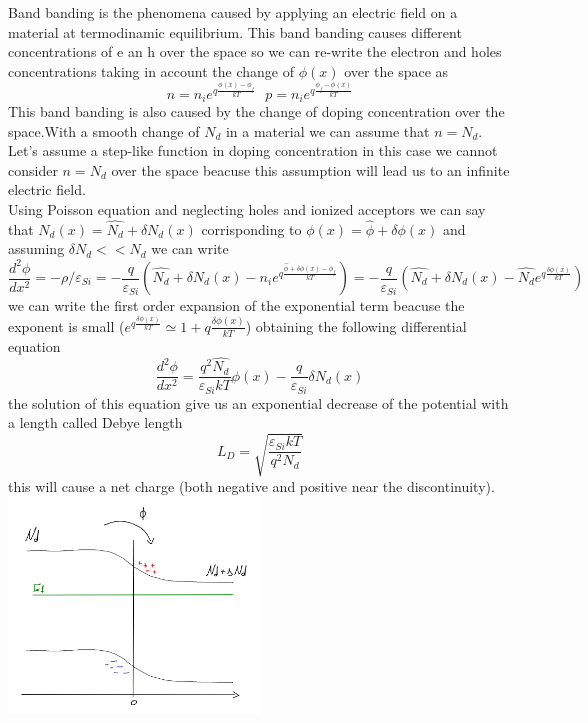 Band banding is the phenomena caused by applying an electric field on a material at termodinamic equilibrium. This band banding causes different concentrations of e an h over the space so we can re-write the electron and holes concentrations taking in account the change of $\phi(x)$ over the space as
\begin{equation}
n=n_ie^{q\frac{\phi(x)-\phi_f}{kT}} \ \ \ p=n_ie^{q\frac{\phi_f-\phi(x)}{kT}}
\end{equation}
This band banding is also caused by the change of doping concentration over the space.With a smooth change of $N_d$ in a material we can assume that $n=N_d$.\\
Let's assume a step-like function in doping concentration in this case we cannot consider $n=N_d$ over the space beacuse this assumption will lead us to an infinite electric field.\\ 
Using Poisson equation and neglecting holes and ionized acceptors we can say that $N_d(x)=\hat{N_d}+\delta N_d(x)$ corrisponding to $\phi(x)=\hat{\phi}+\delta \phi(x)$ and assuming $\delta N_d<<N_d $ we can write
\begin{equation}
\frac{d^2\phi}{dx^2}=-\rho/\varepsilon_{Si}=-\frac{q}{\varepsilon_{Si}}(\hat{N_d}+\delta N_d(x)-n_ie^{q\frac{\hat{\phi}+\delta\phi(x)-\phi_f}{kT}})=-\frac{q}{\varepsilon_{Si}}(\hat{N_d}+\delta N_d(x)-\hat{N_d}e^{q\frac{\delta\phi(x)}{kT}})
\end{equation}  
we can write the first order expansion of the exponential term beacuse the exponent is small ($e^{q\frac{\delta\phi(x)}{kT}}\simeq 1+q\frac{\delta\phi(x)}{kT} $) obtaining the following differential equation
\begin{equation}
\frac{d^2\phi}{dx^2}=\frac{q^2\hat{N_d}}{\varepsilon_{Si}kT}\phi(x)-\frac{q}{\varepsilon_{Si}}\delta N_d(x)
\end{equation}
the solution of this equation give us an exponential decrease of the potential with a length called Debye length
\begin{equation}
L_D=\sqrt{\frac{\varepsilon_{Si}kT}{q^2N_d}}
\end{equation}
this will cause a net charge (both negative and positive near the discontinuity).\\


\centering
\includegraphics[width=0.5\textwidth]{dbeL.png}\\
\raggedright



